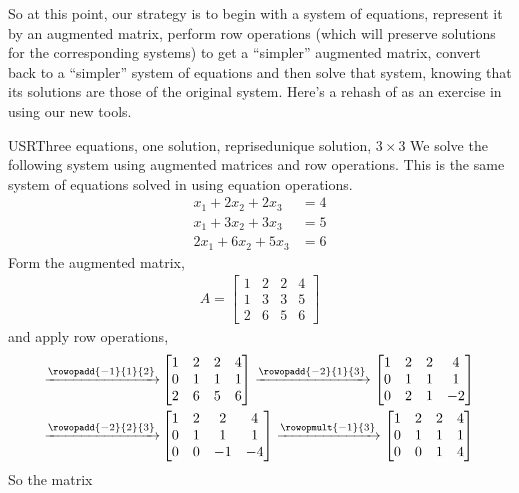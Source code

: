 %
So at this point, our strategy is to begin with a system of equations, represent it by an augmented matrix, perform row operations (which will preserve solutions for the corresponding systems) to get a ``simpler'' augmented matrix, convert back to a ``simpler''  system of equations and then solve that system, knowing that its solutions are those of the original system.  Here's a rehash of  as an exercise in using our new tools.
%
\begin{example}{USR}{Three equations, one solution, reprised}{unique solution, $3\times 3$}
We solve the following system using augmented matrices and row operations.  This is the same system of equations solved in  using equation operations.
\begin{align*}
x_1+2x_2+2x_3&=4\\
x_1+3x_2+3x_3&=5\\
2x_1+6x_2+5x_3&=6
\end{align*}
Form the augmented matrix,
\begin{align*}
A=\begin{bmatrix}
1&2&2&4\\
1&3&3&5\\
2&6&5&6
\end{bmatrix}
\end{align*}
%
and apply row operations,
%
\begin{align*}
\xrightarrow{\rowopadd{-1}{1}{2}}
&
\begin{bmatrix}
1&2&2&4\\
0&1&1&1\\
2&6&5&6
\end{bmatrix}
%
\xrightarrow{\rowopadd{-2}{1}{3}}
\begin{bmatrix}
1&2&2&4\\
0&1&1&1\\
0&2&1&-2
\end{bmatrix}\\
%
\xrightarrow{\rowopadd{-2}{2}{3}}
&
\begin{bmatrix}
1&2&2&4\\
0&1&1&1\\
0&0&-1&-4
\end{bmatrix}
%
\xrightarrow{\rowopmult{-1}{3}}
\begin{bmatrix}
1&2&2&4\\
0&1& 1&1\\
0&0&1&4
\end{bmatrix}
\end{align*}
%
So the matrix
%
\begin{equation*}

\end{equation*}
\end{example}
